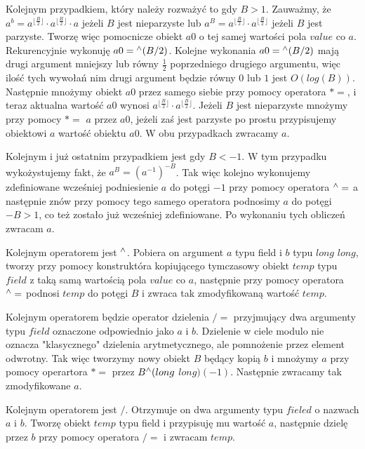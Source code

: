 \documentclass{article}
\begin{document}
Kolejnym przypadkiem, który należy rozważyć to gdy $B>1$. Zauważmy, że $a^b=a^{\lfloor\frac{B}{2} \rfloor} \cdot a^{\lfloor\frac{B}{2} \rfloor} \cdot a$
jeżeli $B$ jest nieparzyste lub $a^B=a^{\lfloor\frac{B}{2} \rfloor} \cdot a^{\lfloor\frac{B}{2} \rfloor}$ jeżeli $B$ jest parzyste.
Tworzę więc pomocnicze obiekt $a0$ o tej samej wartości pola $value$ co $a$. Rekurencyjnie
wykonuję $a0 =\textsuperscript{$\wedge$} (B/2)$. Kolejne wykonania $a0 =\textsuperscript{$\wedge$} (B/2)$
mają drugi argument mniejszy lub równy $\frac{1}{2}$ poprzedniego drugiego argumentu, więc ilość 
tych wywołań nim drugi argument będzie równy $0$ lub $1$ jest $O(log(B))$. Następnie mnożymy obiekt $a0$ przez
samego siebie przy pomocy operatora $*=$, i teraz aktualna wartość $a0$ wynosi 
$a^{\lfloor \frac{B}{2}\rfloor} \cdot a^{\lfloor \frac{B}{2}\rfloor}$. Jeżeli $B$
jest nieparzyste mnożymy przy pomocy $*=$ $a$ przez $a0$, jeżeli zaś jest parzyste 
po prostu przypisujemy obiektowi $a$ wartość obiektu $a0$. W obu przypadkach zwracamy $a$.

Kolejnym i już ostatnim przypadkiem jest gdy $B < -1$. W tym przypadku wykożystujemy 
fakt, że $a^B=(a^{-1})^{-B}$. Tak więc kolejno wykonujemy zdefiniowane wcześniej 
podniesienie $a$ do potęgi $-1$ przy pomocy operatora $\textsuperscript{$\wedge$} =$ a następnie znów przy
pomocy tego samego operatora podnosimy $a$ do potęgi $-B>1$, co też zostało już wcześniej
zdefiniowane. Po wykonaniu tych obliczeń zwracam $a$.

Kolejnym operatorem jest $\textsuperscript{$\wedge$}$. Pobiera on argument $a$ typu field i $b$ typu $long$ $long$, tworzy
przy pomocy konstruktóra kopiującego tymczasowy obiekt $temp$ typu $field$ z taką samą wartością pola 
$value$ co $a$, następnie przy pomocy operatora $\textsuperscript{$\wedge$}=$ podnosi 
$temp$ do potęgi $B$ i zwraca tak zmodyfikowaną wartość $temp$.

Kolejnym operatorem będzie operator dzielenia $/=$ przyjmujący dwa argumenty typu 
$field$ oznaczone odpowiednio jako $a$ i $b$. Dzielenie w ciele modulo nie oznacza
"klasycznego" dzielenia arytmetycznego, ale pomnożenie przez element odwrotny. Tak więc tworzymy nowy obiekt $B$ będący kopią $b$ i mnożymy $a$ przy pomocy
operartora $*=$ przez $B\textsuperscript{$\wedge$}(long$ $long)(-1)$. Następnie zwracamy tak zmodyfikowane $a$.

Kolejnym operatorem jest $/$. Otrzymuje on dwa argumenty typu $fieled$ o nazwach $a$ i $b$. Tworzę obiekt $temp$ typu field i przypisuję mu wartość $a$, następnie dzielę przez $b$ przy pomocy 
operatora $/=$ i zwracam $temp$.
\end{document}
